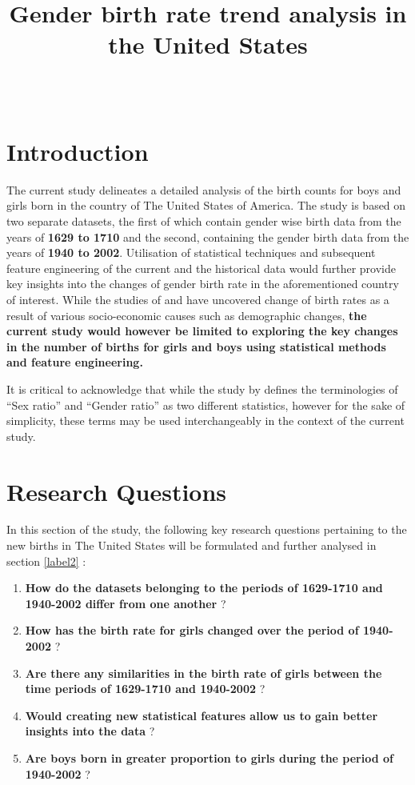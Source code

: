 \documentclass[11pt,a4paper,]{article}
\title{Gender birth rate trend analysis \newline in the United States\huge}
\author{\sf{\Large\textbf{Arindam Baruah}\\\large \href{mailto:abar0090@student.monash.edu}{\nolinkurl{abar0090@student.monash.edu}} (32779267)\\[0.5cm]}}
\date{\sf\Date~\Month~\Year}
\makeatletter
\providecommand{\tightlist}{%
  \setlength{\itemsep}{0pt}\setlength{\parskip}{0pt}}
\def\titlepage{\front{\expandafter{\@title}}{\@author}{\@organization}}
\makeatother
\begin{document}
\titlepage

{
\setcounter{tocdepth}{2}
\tableofcontents
}
\hypertarget{introduction}{%
\section{Introduction}\label{introduction}}

The current study delineates a detailed analysis of the birth counts for boys and girls born in the country of The United States of America. The study is based on two separate datasets, the first of which contain gender wise birth data from the years of \textbf{1629 to 1710} and the second, containing the gender birth data from the years of \textbf{1940 to 2002}. Utilisation of statistical techniques and subsequent feature engineering of the current and the historical data would further provide key insights into the changes of gender birth rate in the aforementioned country of interest. While the studies of \textcite{mathews2005trend} and \textcite{owidgenderratio} have uncovered change of birth rates as a result of various socio-economic causes such as demographic changes, \textbf{the current study would however be limited to exploring the key changes in the number of births for girls and boys using statistical methods and feature engineering.}

It is critical to acknowledge that while the study by \textcite{pryzgoda2000definitions} defines the terminologies of ``Sex ratio'' and ``Gender ratio'' as two different statistics, however for the sake of simplicity, these terms may be used interchangeably in the context of the current study.

\hypertarget{label1}{%
\section{Research Questions}\label{label1}}

In this section of the study, the following key research questions pertaining to the new births in The United States will be formulated and further analysed in section \ref{label2} :

\begin{enumerate}
\def\labelenumi{\arabic{enumi}.}
\tightlist
\item
  \textbf{How do the datasets belonging to the periods of 1629-1710 and 1940-2002 differ from one another} ?
\item
  \textbf{How has the birth rate for girls changed over the period of 1940-2002} ?
\item
  \textbf{Are there any similarities in the birth rate of girls between the time periods of 1629-1710 and 1940-2002} ?
\item
  \textbf{Would creating new statistical features allow us to gain better insights into the data} ?
\item
  \textbf{Are boys born in greater proportion to girls during the period of 1940-2002} ?
\end{enumerate}
\end{document}
